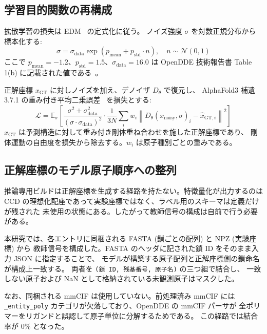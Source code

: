 \documentclass[11pt,a4paper]{article}
\begin{document}
\subsection{学習目的関数の再構成}

拡散学習の損失は EDM~\cite{karras-2022-elucidating} の定式化に従う。
ノイズ強度 $\sigma$ を対数正規分布から標本化する:
\begin{equation}
\sigma = \sigma_{\text{data}} \exp(p_{\text{mean}} + p_{\text{std}} \cdot n),
\quad n \sim \mathcal{N}(0, 1)
\end{equation}
ここで $p_{\text{mean}} = -1.2$、$p_{\text{std}} = 1.5$、$\sigma_{\text{data}} = 16.0$ は
OpenDDE 技術報告書 Table 1(b) に記載された値である~\cite{project-2026-folding}。

正解座標 $x_{\text{GT}}$ に対しノイズを加え、デノイザ $D_\theta$ で復元し、
AlphaFold3 補遺 3.7.1 の重み付き平均二乗誤差~\cite{abramson-2024-accurate} を損失とする:
\begin{equation}
\mathcal{L} = \mathbb{E}_\sigma \left[
\frac{\sigma^2 + \sigma_{\text{data}}^2}{(\sigma \cdot \sigma_{\text{data}})^2}
\cdot \frac{1}{3N}\sum_{i} w_i \left\| D_\theta(x_{\text{noisy}}, \sigma)_i
- \hat{x}_{\text{GT},i} \right\|^2 \right]
\end{equation}
$\hat{x}_{\text{GT}}$ は予測構造に対して重み付き剛体重ね合わせを施した正解座標であり、
剛体運動の自由度を損失から除去する。$w_i$ は原子種別ごとの重みである。

\subsection{正解座標のモデル原子順序への整列}

推論専用ビルドは正解座標を生成する経路を持たない。特徴量化が出力するのは
CCD の理想化配座であって実験座標ではなく、ラベル用のスキーマは定義だけが残された
未使用の状態にある。したがって教師信号の構成は自前で行う必要がある。

本研究では、各エントリに同梱される FASTA (鎖ごとの配列) と NPZ (実験座標) から
教師信号を構成した。FASTA のヘッダに記された鎖 ID をそのまま入力 JSON に指定することで、
モデルが構築する原子配列と正解座標側の鎖命名が構成上一致する。
両者を \texttt{(鎖 ID, 残基番号, 原子名)} の三つ組で結合し、
一致しない原子および NaN として格納されている未観測原子はマスクした。

なお、同梱される mmCIF は使用していない。前処理済み mmCIF には
\texttt{\_entity\_poly} カテゴリが欠落しており、OpenDDE の mmCIF パーサが
全ポリマーをリガンドと誤認して原子単位に分解するためである。
この経路では結合率が 0\% となった。
\end{document}
